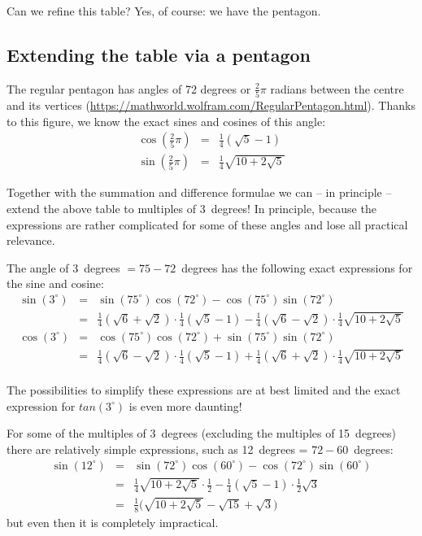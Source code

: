 \documentclass[onecolumn]{article}
\begin{document}
Can we refine this table? Yes, of course: we have the pentagon.

\subsection*{Extending the table via a pentagon}
The regular pentagon has angles of 72 degrees or $\frac{2}{5} \pi$ radians between the centre and its vertices (\url{https://mathworld.wolfram.com/RegularPentagon.html}). Thanks to this
figure, we know the exact sines and cosines of this angle:
\begin{eqnarray*}
    \cos(\frac{2}{5} \pi) &=& \frac{1}{4}(\sqrt{5} - 1) \\
    \sin(\frac{2}{5} \pi) &=& \frac{1}{4}\sqrt{ 10 + 2 \sqrt{5}}
\end{eqnarray*}

Together with the summation and difference formulae we can -- in principle -- extend the above table to multiples of 3~degrees!
In principle, because the expressions are rather complicated for some of these angles and lose all practical relevance.

The angle of 3~degrees $= 75 -72$~degrees has the following exact expressions for the sine and cosine:
\begin{eqnarray*}
     \sin(3^\circ)  &=& \sin(75^\circ) \cos(72^\circ) - \cos(75^\circ) \sin(72^\circ) \\
                    &=& \frac{1}{4} (\sqrt{6} + \sqrt{2}) \cdot \frac{1}{4}(\sqrt{5} - 1) - \frac{1}{4} (\sqrt{6} - \sqrt{2}) \cdot \frac{1}{4}\sqrt{ 10 + 2 \sqrt{5}} \\
     \cos(3^\circ)  &=& \cos(75^\circ) \cos(72^\circ) + \sin(75^\circ) \sin(72^\circ) \\
                    &=& \frac{1}{4} (\sqrt{6} - \sqrt{2}) \cdot \frac{1}{4}(\sqrt{5} - 1) + \frac{1}{4} (\sqrt{6} + \sqrt{2}) \cdot \frac{1}{4}\sqrt{ 10 + 2 \sqrt{5}} \\
\end{eqnarray*}

The possibilities to simplify these expressions are at best limited and the exact expression for $tan(3^\circ)$ is even more daunting!

For some of the multiples of 3~degrees (excluding the multiples of 15~degrees) there are relatively simple expressions, such as 12~degrees = $72 - 60$~degrees:
\begin{eqnarray*}
     \sin(12^\circ) &=& \sin(72^\circ) \cos(60^\circ) - \cos(72^\circ) \sin(60^\circ) \\
                    &=& \frac{1}{4}\sqrt{10 + 2 \sqrt{5}} \cdot \frac{1}{2} - \frac{1}{4}(\sqrt{5} - 1) \cdot \frac{1}{2} \sqrt{3} \\
                    &=& \frac{1}{8} \bigl(\sqrt{10 + 2 \sqrt{5}} - \sqrt{15} + \sqrt{3} \bigr)
\end{eqnarray*}
\noindent but even then it is completely impractical.
\end{document}
